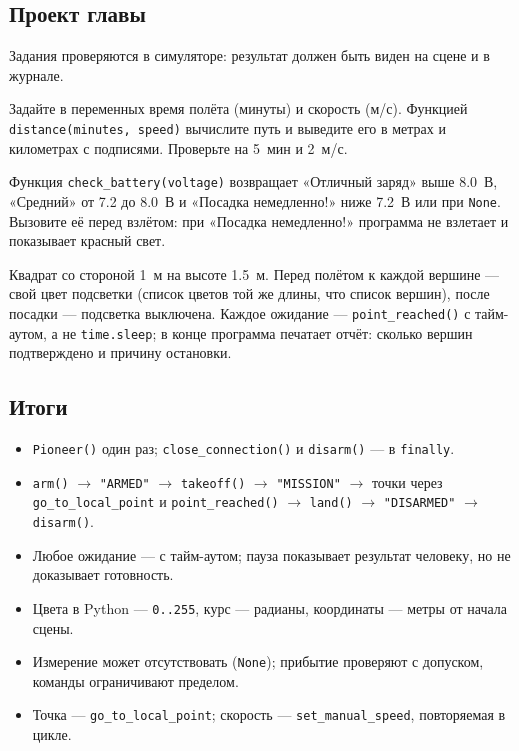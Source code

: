 \subsection{Проект главы}

Задания проверяются в симуляторе: результат должен быть виден на сцене и в журнале.

\begin{taskbox}
Задайте в переменных время полёта (минуты) и скорость (м/с). Функцией \verb|distance(minutes, speed)| вычислите путь и выведите его в метрах и километрах с подписями. Проверьте на 5~мин и 2~м/с.
\end{taskbox}

\begin{taskbox}
Функция \verb|check_battery(voltage)| возвращает «Отличный заряд» выше 8.0~В, «Средний» от 7.2 до 8.0~В и «Посадка немедленно!» ниже 7.2~В или при \verb|None|. Вызовите её перед взлётом: при «Посадка немедленно!» программа не взлетает и показывает красный свет.
\end{taskbox}

\begin{taskbox}
Квадрат со стороной 1~м на высоте 1.5~м. Перед полётом к каждой вершине --- свой цвет подсветки (список цветов той же длины, что список вершин), после посадки --- подсветка выключена. Каждое ожидание --- \verb|point_reached()| с тайм-аутом, а не \verb|time.sleep|; в конце программа печатает отчёт: сколько вершин подтверждено и причину остановки.
\end{taskbox}

\subsection*{Итоги}
\begin{itemize}
    \item \verb|Pioneer()| один раз; \verb|close_connection()| и \verb|disarm()| --- в \verb|finally|.
    \item \verb|arm()| $\to$ \verb|"ARMED"| $\to$ \verb|takeoff()| $\to$ \verb|"MISSION"| $\to$ точки через \verb|go_to_local_point| и \verb|point_reached()| $\to$ \verb|land()| $\to$ \verb|"DISARMED"| $\to$ \verb|disarm()|.
    \item Любое ожидание --- с тайм-аутом; пауза показывает результат человеку, но не доказывает готовность.
    \item Цвета в Python --- \verb|0..255|, курс --- радианы, координаты --- метры от начала сцены.
    \item Измерение может отсутствовать (\verb|None|); прибытие проверяют с допуском, команды ограничивают пределом.
    \item Точка --- \verb|go_to_local_point|; скорость --- \verb|set_manual_speed|, повторяемая в цикле.
\end{itemize}
